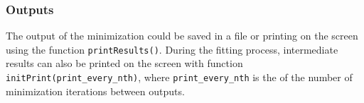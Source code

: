 \subsubsection{Outputs}
The output of the minimization could be saved in a file or printing on
the screen using the function \texttt{printResults()}. During the
fitting process, intermediate results can also be printed on the
screen with function \texttt{initPrint(print\_every\_nth)}, where
\texttt{print\_every\_nth} is the of the number of
 minimization iterations between outputs.
